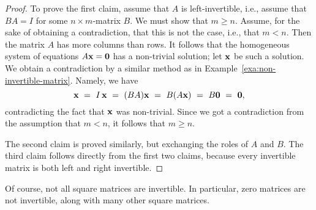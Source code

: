 \begin{proof}
  To prove the first claim, assume that $A$ is left-invertible, i.e.,
  assume that $BA=I$ for some $n\times m$-matrix $B$. We must show
  that $m\geq n$. Assume, for the sake of obtaining a contradiction,
  that this is not the case, i.e., that $m<n$. Then the matrix $A$ has
  more columns than rows. It follows that the homogeneous system of
  equations $A\mbox{\bf x}=\mbox{\bf 0}$ has a non-trivial solution; let
  $\mbox{\bf x}$ be such a solution. We obtain a contradiction by a
  similar method as in
  Example~\ref{exa:non-invertible-matrix}. Namely, we have
  \begin{equation*}
    \mbox{\bf x} ~=~ I\,\mbox{\bf x} ~=~ (BA)\mbox{\bf x} ~=~ B(A\mbox{\bf x}) ~=~ B\mbox{\bf 0} ~=~
    \mbox{\bf 0},
  \end{equation*}
  contradicting the fact that $\mbox{\bf x}$ was non-trivial.  Since we
  got a contradiction from the assumption that $m<n$, it follows that
  $m\geq n$.

  The second claim is proved similarly, but exchanging the roles of
  $A$ and $B$.  The third claim follows directly from the first two
  claims, because every invertible matrix is both left and right
  invertible.
\end{proof}

Of course, not all square matrices are invertible. In particular, zero
matrices are not invertible, along with many other square matrices.

